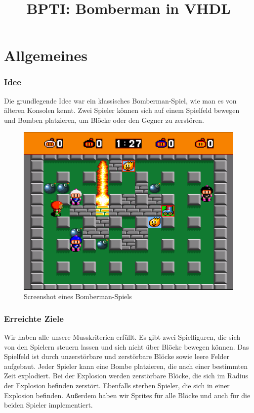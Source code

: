 \documentclass[parskip=full]{scrartcl}
\title{BPTI: Bomberman in VHDL}
\begin{document}
	\maketitle
	\tableofcontents
	\newpage
	
	\part{Allgemeines}
		\section{Idee}
			Die grundlegende Idee war ein klassisches Bomberman-Spiel, wie man es von älteren Konsolen kennt. Zwei Spieler können sich auf einem Spielfeld bewegen und Bomben platzieren, um Blöcke oder den Gegner zu zerstören.
			\begin{figure}[H]
				\centering
				\includegraphics[scale=0.4]{./bilder/bomberman.png}
				\caption{Screenshot eines Bomberman-Spiels}
			\end{figure}
		
		\section{Erreichte Ziele}
			Wir haben alle unsere Musskriterien erfüllt. Es gibt zwei Spielfiguren, die sich von den Spielern steuern lassen und sich nicht über Blöcke bewegen können. Das Spielfeld ist durch unzerstörbare und  zerstörbare Blöcke sowie leere Felder aufgebaut. Jeder Spieler kann eine Bombe platzieren, die nach einer bestimmten Zeit explodiert. Bei der Explosion werden zerstörbare Blöcke, die sich im Radius der Explosion befinden zerstört. Ebenfalls sterben Spieler, die sich in einer Explosion befinden. \newline
			Außerdem haben wir Sprites für alle Blöcke und auch für die beiden Spieler implementiert. \newline
			
\end{document}

